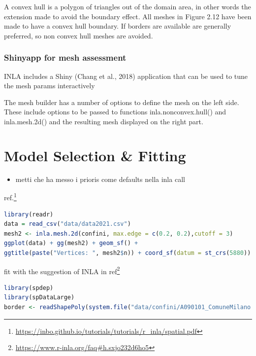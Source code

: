 \documentclass[
  12pt,
  a4paper,
  oneside]{book}
\DeclareRobustCommand{\href}[2]{#2\footnote{\url{#1}}}
\providecommand{\tightlist}{%
  \setlength{\itemsep}{0pt}\setlength{\parskip}{0pt}}
\theoremstyle{definition}
\theoremstyle{definition}
\theoremstyle{definition}
\theoremstyle{remark}
\begin{document}
A convex hull is a polygon of triangles out of the domain area, in other words the extension made to avoid the boundary effect. All meshes in Figure 2.12 have been made to have a convex hull boundary. If borders are available are generally preferred, so non convex hull meshes are avoided.

\hypertarget{shinyapp-for-mesh-assessment}{%
\subsection{Shinyapp for mesh assessment}\label{shinyapp-for-mesh-assessment}}

INLA includes a Shiny (Chang et al., 2018) application that can be used to tune the mesh params interactively

The mesh builder has a number of options to define the mesh on the left side. These include options to be passed to functions inla.nonconvex.hull() and inla.mesh.2d() and the resulting mesh displayed on the right part.

\hypertarget{modelspec}{%
\chapter{Model Selection \& Fitting}\label{modelspec}}

\begin{itemize}
\tightlist
\item
  metti \citet{Ling} che ha messo i prioris come defaults nella inla call
\end{itemize}

\href{https://inbo.github.io/tutorials/tutorials/r_inla/spatial.pdf}{ref.}

\begin{lstlisting}[language=R]
library(readr)
data = read_csv("data/data2021.csv")
mesh2 <- inla.mesh.2d(confini, max.edge = c(0.2, 0.2),cutoff = 3)
ggplot(data) + gg(mesh2) + geom_sf() +
ggtitle(paste("Vertices: ", mesh2$n)) + coord_sf(datum = st_crs(5880))
\end{lstlisting}

fit with the suggestion of INLA in \href{https://www.r-inla.org/faq\#h.sxjo232d6ho5}{ref}

\begin{lstlisting}[language=R]
library(spdep)
library(spDataLarge)
border <- readShapePoly(system.file("data/confini/A090101_ComuneMilano.shp", package="spdep")[1])
\end{lstlisting}
\end{document}
